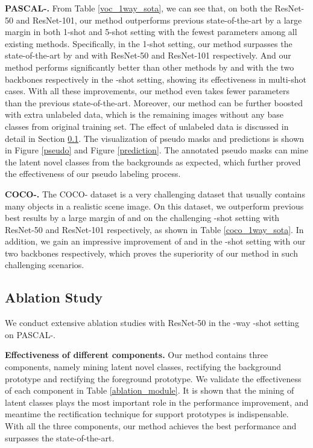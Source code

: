 \documentclass[10pt,twocolumn,letterpaper]{article}
\begin{document}
\textbf{PASCAL-.}
From Table \ref{voc_1way_sota}, we can see that, on both the ResNet-50 and ResNet-101, our method outperforms previous state-of-the-art by a large margin in both 1-shot and 5-shot setting with the fewest parameters among all existing methods. Specifically, in the 1-shot setting, our method surpasses the state-of-the-art by  and  with ResNet-50 and ResNet-101 respectively. And our method performs significantly better than other methods by  and  with the two backbones respectively in the -shot setting, showing its effectiveness in multi-shot cases. With all these improvements, our method even takes  fewer parameters than the previous state-of-the-art. Moreover, our method can be further boosted with extra unlabeled data, which is the remaining images without any base classes from original training set. The effect of unlabeled data is discussed in detail in Section \ref{ablation_sec}. The visualization of pseudo masks and predictions is shown in Figure \ref{pseudo} and Figure \ref{prediction}. The annotated pseudo masks can mine the latent novel classes from the backgrounds as expected, which further proved the effectiveness of our pseudo labeling process.

\textbf{COCO-.} 
The COCO- dataset is a very challenging dataset that usually contains many objects in a realistic scene image. On this dataset, we outperform previous best results by a large margin of  and  on the challenging -shot setting with ResNet-50 and ResNet-101 respectively, as shown in Table \ref{coco_1way_sota}. In addition, we gain an impressive improvement of  and  in the -shot setting with our two backbones respectively, which proves the superiority of our method in such challenging scenarios.


\subsection{Ablation Study} \label{ablation_sec}

We conduct extensive ablation studies with ResNet-50 in the -way -shot setting on PASCAL-.

\textbf{Effectiveness of different components.}
Our method contains three components, namely mining latent novel classes, rectifying the background prototype and rectifying the foreground prototype. We validate the effectiveness of each component in Table \ref{ablation_module}. It is shown that the mining of latent classes plays the most important role in the performance improvement, and meantime the rectification technique for support prototypes is indispensable. With all the three components, our method achieves the best performance and surpasses the state-of-the-art.
\end{document}
